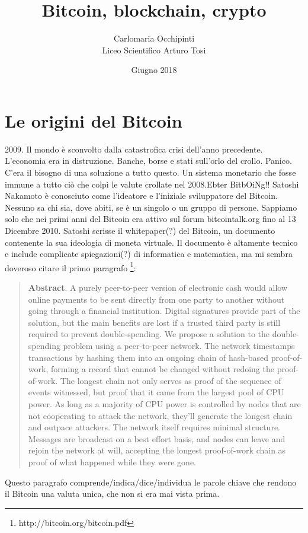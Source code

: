 \documentclass {article}
\title {{\Huge Bitcoin, blockchain, crypto}}
\author {Carlomaria Occhipinti\\Liceo Scientifico Arturo Tosi}
\date {Giugno 2018}
\begin{document}
\maketitle


\newpage

\tableofcontents


\newpage


\section {Le origini del Bitcoin}


2009. Il mondo è sconvolto dalla catastrofica crisi dell'anno precedente.
L'economia era in distruzione. Banche, borse e stati sull'orlo del crollo. Panico.
C'era il bisogno di una soluzione a tutto questo. Un sistema monetario che fosse immune a tutto ciò che colpì le valute crollate nel 2008.Ebter BitbOiNg!!
Satoshi Nakamoto è conosciuto come l'ideatore e l'iniziale sviluppatore del Bitcoin. Nessuno sa chi sia, dove abiti, se è un singolo o un gruppo di persone. Sappiamo solo che nei primi anni del Bitcoin era attivo sul forum bitcointalk.org fino al 13 Dicembre 2010.
Satoshi scrisse il whitepaper(?) del Bitcoin, un documento contenente la sua ideologia di moneta virtuale. Il documento è altamente tecnico e include complicate spiegazioni(?) di informatica e matematica, ma mi sembra doveroso citare il primo paragrafo \footnote{http://bitcoin.org/bitcoin.pdf}:\\

\begin {quote}

\textbf {Abstract}. A purely peer-to-peer version of electronic cash would allow online payments to be sent directly from one party to another without going through a financial institution. Digital signatures provide part of the solution, but the main benefits are lost if a trusted third party is still required to prevent double-spending. We propose a solution to the double-spending problem using a peer-to-peer network. The network timestamps transactions by hashing them into an ongoing chain of hash-based proof-of-work, forming a record that cannot be changed without redoing the proof-of-work. The longest chain not only serves as proof of the sequence of events witnessed, but proof that it came from the largest pool of CPU power. As long as a majority of CPU power is controlled by nodes that are not cooperating to attack the network, they'll generate the longest chain and outpace attackers. The network itself requires minimal structure. Messages are broadcast on a best effort basis, and nodes can leave and rejoin the network at will, accepting the longest proof-of-work chain as proof of what happened while they were gone.

\end {quote}
Questo paragrafo comprende/indica/dice/individua le parole chiave che rendono il Bitcoin una valuta unica, che non si era mai vista prima.
\end{document}

